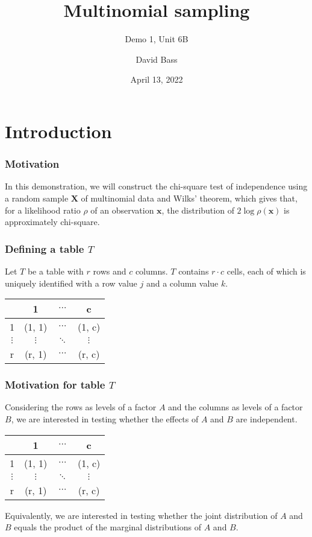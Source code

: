 \documentclass{beamer}
\title{Multinomial sampling}
\subtitle{Demo 1, Unit 6B}
\author{David Bass}
\date{April 13, 2022}
\begin{document}
\begin{frame}
\titlepage
\end{frame}

\section{Introduction}
\begin{frame}
\frametitle{Motivation}
In this demonstration, we will construct the chi-square test of independence using a random sample $\textbf{X}$ of multinomial data and Wilks' theorem, which gives that, for a likelihood ratio $\rho$ of an observation $\textbf{x}$, the distribution of $2\log\rho(\textbf{x})$ is approximately chi-square.
\end{frame}

\begin{frame}
\frametitle{Defining a table $T$}

Let $T$ be a table with $r$ rows and $c$ columns. $T$ contains $r\cdot c$ cells, each of which is uniquely identified with a row value $j$ and a column value $k$.
\vskip0.2in
\begin{center}
	\begin{tabular}{ |c|c|c|c| } 
		\hline
		&1 & $\cdots$ & c \\ 
		\hline
		1&(1, 1) &$\cdots$ & (1, c) \\ 
		\hline
		$\vdots$& $\vdots$& $\ddots$ & $\vdots$ \\ 
		\hline
		r&(r, 1) & $\cdots$ & (r, c) \\ 
		\hline
	\end{tabular}
\end{center}
\end{frame}

\begin{frame}
	\frametitle{Motivation for table $T$}
	
	Considering the rows as levels of a factor $A$ and the columns as levels of a factor $B$, we are interested in testing whether the effects of $A$ and $B$ are independent.
	\vskip0.2in
	\begin{center}
		\begin{tabular}{ |c|c|c|c| } 
			\hline
			&1 & $\cdots$ & c \\ 
			\hline
			1&(1, 1) &$\cdots$ & (1, c) \\ 
			\hline
			$\vdots$& $\vdots$& $\ddots$ & $\vdots$ \\ 
			\hline
			r&(r, 1) & $\cdots$ & (r, c) \\ 
			\hline
		\end{tabular}
	\end{center}
	\vskip0.2in
	Equivalently, we are interested in testing whether the joint distribution of $A$ and $B$ equals the product of the marginal distributions of $A$ and $B$.
\end{frame}
\end{document}
